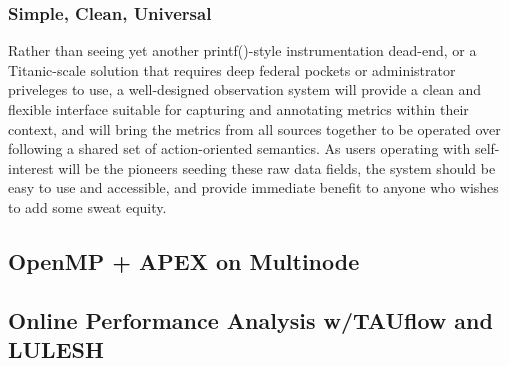\subsubsection{Simple, Clean, Universal}
Rather than seeing yet another printf()-style instrumentation
dead-end, or a Titanic-scale solution that requires deep federal
pockets or administrator priveleges to use, a well-designed
observation system will provide a clean and flexible interface
suitable for capturing and annotating metrics within their context,
and will bring the metrics from all sources together to be operated
over following a shared set of action-oriented semantics.
%
As users operating with self-interest will be the pioneers seeding
these raw data fields, the system should be easy to use and
accessible, and provide immediate benefit to anyone who wishes to add
some sweat equity.






\subsection{OpenMP + APEX on Multinode}



\subsection{Online Performance Analysis w/TAUflow and LULESH}



